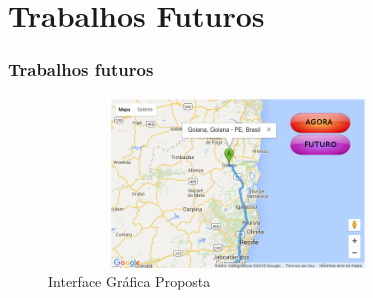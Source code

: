 \documentclass[11pt]{beamer}
\begin{document}
\section{ Trabalhos Futuros}
\begin{frame}\frametitle{Trabalhos futuros}
	
	\begin{figure}[ht]
		\centering
		\caption{ Interface Gráfica Proposta}
		\includegraphics[width=100mm, height=45mm]{Figuras/BigData/InterfaceGrafica.png}
	\end{figure}
	
\end{frame}
\end{document}
